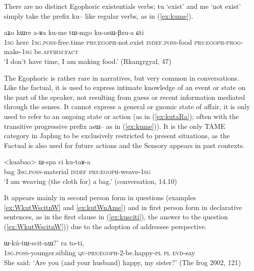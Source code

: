 \documentclass[oldfontcommands,oneside,a4paper,11pt]{article}
\newcommand{\ipa}[1]{{\phon \mbox{#1}}} %
\newcommand{\refb}[1]{(\ref{#1})}
\newcommand{\factual}[1]{\textsc{:fact}}
\begin{document}
There are no distinct Egophoric existentials verbs; \ipa{tu} `exist' and \ipa{me}  `not exist' simply take the prefix \ipa{ku--} like regular verbs, as in \refb{ex:kume}.

\begin{exe}
\ex \label{ex:kume}
\gll 
\ipa{aʑo}  	\ipa{kɯre}  	\ipa{a-ʁa}  	\ipa{ku-me}  \ipa{tɯ-mgo} 	\ipa{ku-osɯ-βzu-a} 	\ipa{ɕti} 	  	\\
\textsc{1sg} here \textsc{1sg.poss}-free.time \textsc{prs:egoph}-not.exist \textsc{indef.poss}-food \textsc{prs:egoph}-\textsc{prog}-make-\textsc{1sg} be.\textsc{affirm}\factual{}  \\
\glt `I don't have time, I am making food.'  (Rkangrgyal, 47)
\end{exe}

The Egophoric  is rather rare in narratives, but very common in conversations. Like the factual, it is used to express intimate knowledge of an event or state on the part of the speaker, not resulting from guess or recent information mediated through the senses. It cannot express a general or gnomic state of affair, it is only used to refer to an ongoing state or action (as in \refb{ex:kutaRa}; often with the transitive progressive prefix \ipa{asɯ--} as in \refb{ex:kume}). It is the only TAME category in Japhug to be exclusively restricted to present situations, as the Factual is also used for future actions and the Sensory appears in past contexts.

\begin{exe}
\ex \label{ex:kutaRa}
\gll 
<kuabao> 	\ipa{ɯ-spa}  	\ipa{ci}  	\ipa{ku-taʁ-a}  \\
bag \textsc{3sg.poss}-material \textsc{indef} \textsc{prs:egoph}-weave-\textsc{1sg} \\
\glt `I am weaving (the cloth for) a bag.' (conversation, 14.10)
\end{exe}


It appears mainly  in second person form in questions (examples \ref{ex:WkutWscitnW} and \ref{ex:kutWnAme}) and in first person form in declarative sentences, as in the first clause in \refb{ex:kusciti}, the answer to the question \refb{ex:WkutWscitnW}) due to the adoption of addressee perspective.

\begin{exe}
\ex \label{ex:WkutWscitnW}
\gll  \ipa{`a-ʁi} 			\ipa{ɯ-kú-tɯ-scit-nɯ?}' 	\ipa{ra} 	\ipa{to-ti,} \\
\textsc{1sg.poss}-younger.sibling  \textsc{qu-prs:egoph}-2-be.happy-\textsc{pl} \textsc{pl} \textsc{evd}-say \\
\glt She said: `Are you (and your husband) happy, my sister?' (The frog 2002, 121)
\end{exe}
\end{document}
